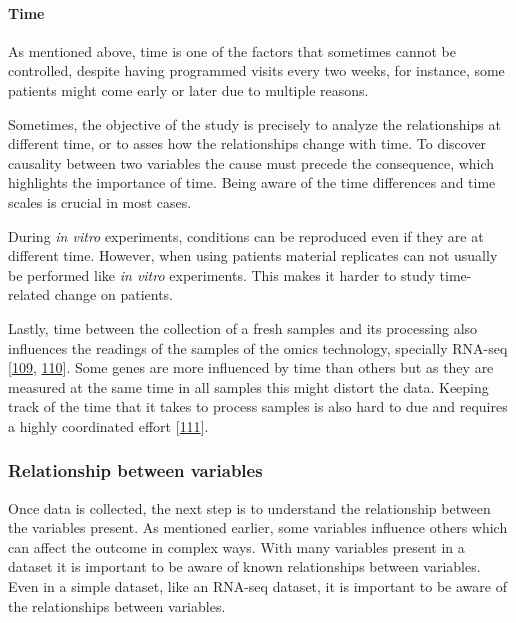 \documentclass[
  12pt,
  a4paper,
  twoside,
  openright]{book}
\begin{document}
\hypertarget{time}{%
\paragraph*{Time}\label{time}}

As mentioned above, time is one of the factors that sometimes cannot be controlled, despite having programmed visits every two weeks, for instance, some patients might come early or later due to multiple reasons.

Sometimes, the objective of the study is precisely to analyze the relationships at different time, or to asses how the relationships change with time.
To discover causality between two variables the cause must precede the consequence, which highlights the importance of time.
Being aware of the time differences and time scales is crucial in most cases.

During \emph{in vitro} experiments, conditions can be reproduced even if they are at different time.
However, when using patients material replicates can not usually be performed like \emph{in vitro} experiments.
This makes it harder to study time-related change on patients.

Lastly, time between the collection of a fresh samples and its processing also influences the readings of the samples of the omics technology, specially RNA-seq {[}\protect\hyperlink{ref-massoni-badosa2020}{109}, \protect\hyperlink{ref-zhu2017}{110}{]}.
Some genes are more influenced by time than others but as they are measured at the same time in all samples this might distort the data.
Keeping track of the time that it takes to process samples is also hard to due and requires a highly coordinated effort {[}\protect\hyperlink{ref-ferreira2018}{111}{]}.

\hypertarget{relationship-between-variables}{%
\subsubsection{Relationship between variables}\label{relationship-between-variables}}

Once data is collected, the next step is to understand the relationship between the variables present.
As mentioned earlier, some variables influence others which can affect the outcome in complex ways.
With many variables present in a dataset it is important to be aware of known relationships between variables.
Even in a simple dataset, like an RNA-seq dataset, it is important to be aware of the relationships between variables.
\end{document}
